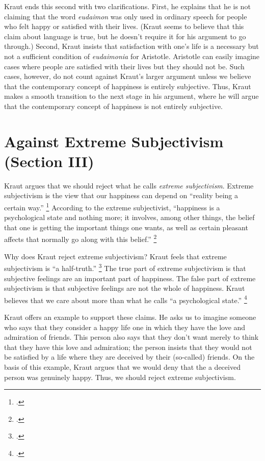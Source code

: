 \documentclass[12pt,letterpaper]{article}
\begin{document}
Kraut ends this second with two clarifications.
First, he explains that he is not claiming that the word \textit{eudaimon} was only used in ordinary speech for people who felt happy or satisfied with their lives.
(Kraut seems to believe that this claim about language is true, but he doesn't require it for his argument to go through.)
Second, Kraut insists that satisfaction with one's life is a necessary but not a sufficient condition of \textit{eudaimonia} for Aristotle.
Aristotle can easily imagine cases where people are satisfied with their lives but they should not be.
Such cases, however, do not count against Kraut's larger argument unless we believe that the contemporary concept of happiness is entirely subjective.
Thus, Kraut makes a smooth transition to the next stage in his argument, where he will argue that the contemporary concept of happiness is not entirely subjective.

\section*{Against Extreme Subjectivism (Section III)}

Kraut argues that we should reject what he calls \textit{extreme subjectivism}.
Extreme subjectivism is the view that our happiness can depend on ``reality being a certain way.''%
\footcite[][178, note 21]{two-conceptions-of-happiness-kraut-1979}
According to the extreme subjectivist, ``happiness is a psychological state and nothing more; it involves, among other things, the belief that one is getting the important things one wants, as well as certain pleasant affects that normally go along with this belief.''%
\footcite[][178]{two-conceptions-of-happiness-kraut-1979}

Why does Kraut reject extreme subjectivism?
Kraut feels that extreme subjectivism is ``a half-truth.''%
\footcite[][178]{two-conceptions-of-happiness-kraut-1979}
The true part of extreme subjectivism is that subjective feelings are an important part of happiness.
The false part of extreme subjectivism is that subjective feelings are not the whole of happiness.
Kraut believes that we care about more than what he calls ``a psychological state.''%
\footcite[][179]{two-conceptions-of-happiness-kraut-1979}

Kraut offers an example to support these claims.
He asks us to imagine someone who says that they consider a happy life one in which they have the love and admiration of friends.
This person also says that they don't want merely to think that they have this love and admiration; the person insists that they would not be satisfied by a life where they are deceived by their (so-called) friends.
On the basis of this example, Kraut argues that we would deny that the a deceived person was genuinely happy.
Thus, we should reject extreme subjectivism.
\end{document}
